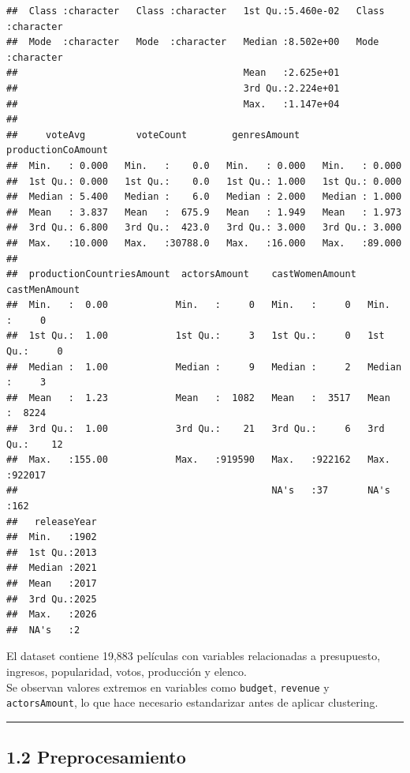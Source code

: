 \documentclass[
]{article}
\begin{document}
\begin{verbatim}
##  Class :character   Class :character   1st Qu.:5.460e-02   Class :character  
##  Mode  :character   Mode  :character   Median :8.502e+00   Mode  :character  
##                                        Mean   :2.625e+01                     
##                                        3rd Qu.:2.224e+01                     
##                                        Max.   :1.147e+04                     
##                                                                              
##     voteAvg         voteCount        genresAmount    productionCoAmount
##  Min.   : 0.000   Min.   :    0.0   Min.   : 0.000   Min.   : 0.000    
##  1st Qu.: 0.000   1st Qu.:    0.0   1st Qu.: 1.000   1st Qu.: 0.000    
##  Median : 5.400   Median :    6.0   Median : 2.000   Median : 1.000    
##  Mean   : 3.837   Mean   :  675.9   Mean   : 1.949   Mean   : 1.973    
##  3rd Qu.: 6.800   3rd Qu.:  423.0   3rd Qu.: 3.000   3rd Qu.: 3.000    
##  Max.   :10.000   Max.   :30788.0   Max.   :16.000   Max.   :89.000    
##                                                                        
##  productionCountriesAmount  actorsAmount    castWomenAmount  castMenAmount   
##  Min.   :  0.00            Min.   :     0   Min.   :     0   Min.   :     0  
##  1st Qu.:  1.00            1st Qu.:     3   1st Qu.:     0   1st Qu.:     0  
##  Median :  1.00            Median :     9   Median :     2   Median :     3  
##  Mean   :  1.23            Mean   :  1082   Mean   :  3517   Mean   :  8224  
##  3rd Qu.:  1.00            3rd Qu.:    21   3rd Qu.:     6   3rd Qu.:    12  
##  Max.   :155.00            Max.   :919590   Max.   :922162   Max.   :922017  
##                                             NA's   :37       NA's   :162     
##   releaseYear  
##  Min.   :1902  
##  1st Qu.:2013  
##  Median :2021  
##  Mean   :2017  
##  3rd Qu.:2025  
##  Max.   :2026  
##  NA's   :2
\end{verbatim}

El dataset contiene 19,883 películas con variables relacionadas a
presupuesto, ingresos, popularidad, votos, producción y elenco.\\
Se observan valores extremos en variables como \texttt{budget},
\texttt{revenue} y \texttt{actorsAmount}, lo que hace necesario
estandarizar antes de aplicar clustering.

\begin{center}\rule{0.5\linewidth}{0.5pt}\end{center}

\subsection{1.2 Preprocesamiento}\label{preprocesamiento}
\end{document}
